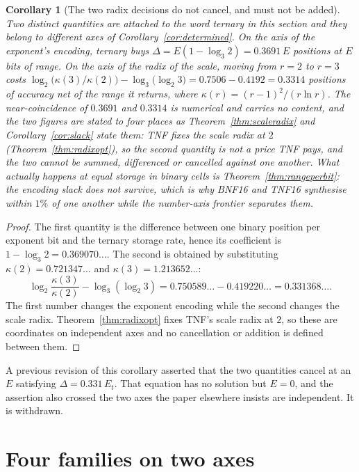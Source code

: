 \documentclass[11pt]{article}
\newtheorem{corollary}{Corollary}
\theoremstyle{definition}
\begin{document}
\begin{corollary}[The two radix decisions do not cancel, and must not be added]
\label{cor:worth}
Two distinct quantities are attached to the word \emph{ternary} in this section and
they belong to different axes of Corollary~\ref{cor:determined}. On the axis of the
\emph{exponent's encoding}, ternary buys $\Delta = E(1-\log_3 2) = 0.3691\,E$
positions at $E$ bits of range. On the axis of the \emph{radix of the scale},
moving from $r{=}2$ to $r{=}3$ costs $\log_2\bigl(\kappa(3)/\kappa(2)\bigr) -
\log_3\bigl(\log_2 3\bigr) = 0.7506 - 0.4192 = 0.3314$ positions of accuracy net
of the range it returns, where
$\kappa(r) = (r-1)^2/(r \ln r)$. The near-coincidence of $0.3691$ and $0.3314$ is
numerical and carries no content, and the two figures are stated to four places as
Theorem~\ref{thm:scaleradix} and Corollary~\ref{cor:slack} state them: TNF fixes the scale radix at $2$
(Theorem~\ref{thm:radixopt}), so the second quantity is not a price TNF pays, and
the two cannot be summed, differenced or cancelled against one another. What
actually happens at equal storage in binary cells is
Theorem~\ref{thm:rangeperbit}: the encoding slack does not survive, which is why
BNF16 and TNF16 synthesise within $1\%$ of one another while the number-axis
frontier separates them.
\end{corollary}
\begin{proof}
The first quantity is the difference between one binary position per exponent
bit and the ternary storage rate, hence its coefficient is
$1-\log_3 2=0.369070\ldots$. The second is obtained by substituting
$\kappa(2)=0.721347\ldots$ and $\kappa(3)=1.213652\ldots$:
\[
\log_2\!\frac{\kappa(3)}{\kappa(2)}
-\log_3(\log_2 3)
=0.750589\ldots-0.419220\ldots
=0.331368\ldots.
\]
The first number changes the exponent encoding while the second changes the
scale radix. Theorem~\ref{thm:radixopt} fixes TNF's scale radix at $2$, so
these are coordinates on independent axes and no cancellation or addition is
defined between them.
\end{proof}

A previous revision of this corollary asserted that the two quantities cancel at
an $E$ satisfying $\Delta = 0.331\,E_t$. That equation has no solution but
$E = 0$, and the assertion also crossed the two axes the paper elsewhere insists
are independent. It is withdrawn.


\section{Four families on two axes}\label{sec:fourfamilies}
\end{document}
